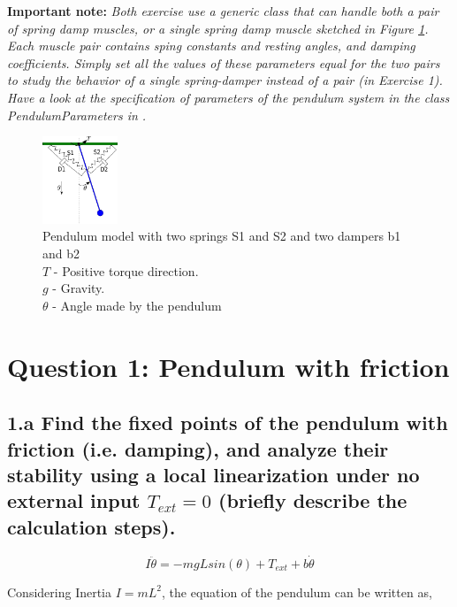 \documentclass{cmc}
\begin{document}
\textbf{Important note:}
\textit{Both exercise use a generic class that can handle both a pair of
		spring damp muscles, or a single spring damp muscle sketched in Figure		
		\ref{fig:spring_mass_damper_sketch}. Each muscle pair
		contains sping constants and resting angles, and damping coefficients.
		Simply set all the values of these parameters equal for the two pairs
		to study the behavior of a single spring-damper instead of a pair (in Exercise 1).
		Have a look at the specification of parameters of the pendulum
		system in the class \textit{PendulumParameters} in .}


\begin{figure}[ht]
  \centering \includegraphics[width=0.2\textwidth]{figures/pendulum_spring_damper}
  \caption[pendulum with spring]{Pendulum model with two springs S1
    and S2 and two dampers b1 and b2\\
    $T$ - Positive torque direction.\\
    $g$ - Gravity.\\
    $\theta$ - Angle made by the pendulum
    \label{fig:spring_mass_damper_sketch} }
\end{figure}



\section*{Question 1: Pendulum with friction}

\subsection*{1.a Find the fixed points of the pendulum with friction
  (i.e. damping), and analyze their stability using a local linearization
  under no external input $T_{ext}=0$ (briefly describe the calculation steps). }


\begin{equation}
  \label{eq:ode-pendulum}
  I\ddot{\theta} = -mgLsin(\theta) + T_{ext} + b \dot{\theta}
\end{equation}

Considering Inertia $I = mL^2$, the equation of the pendulum can be
written as,
\end{document}
